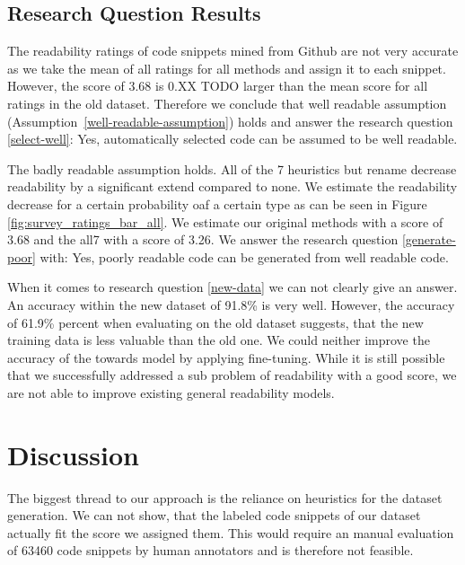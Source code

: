 \documentclass[%
class=scrreprt,
chapterprefix=false,%
open=right,%
twoside=false,%
paper=a4,%
logofile={Logo\_zentral\_farbig\_EN.png},%
thesistype=master,%
UKenglish,%
]{se2thesis}
\theoremstyle{definition}
\begin{document}
\subsection{Research Question Results} \label{Research Question Results}

	The readability ratings of code snippets mined from Github are not very accurate as we take the mean of all ratings for all methods and assign it to each snippet. However, the score of 3.68 is 0.XX TODO larger than the mean score for all ratings in the old dataset. Therefore we conclude that well readable assumption (Assumption~\ref{well-readable-assumption}) holds and answer the research question \ref{select-well}: Yes, automatically selected code can be assumed to be well readable.
	
	The badly readable assumption holds. All of the 7 heuristics but rename decrease readability by a significant extend compared to none. We estimate the readability decrease for a certain probability oaf a certain type as can be seen in Figure \ref{fig:survey_ratings_bar_all}. We estimate our original methods with a score of 3.68 and the all7 with a score of 3.26. We answer the research question \ref{generate-poor} with: Yes, poorly readable code can be generated from well readable code.
	
	When it comes to research question \ref{new-data} we can not clearly give an answer. An accuracy within the new dataset of 91.8\% is very well. However, the accuracy of 61.9\% percent when evaluating on the old dataset suggests, that the new training data is less valuable than the old one. We could neither improve the accuracy of the towards model by applying fine-tuning. While it is still possible that we successfully addressed a sub problem of readability with a good score, we are not able to improve existing general readability models.
	
\section{Discussion} \label{Discussion}

	The biggest thread to our approach is the reliance on heuristics for the dataset generation. We can not show, that the labeled code snippets of our dataset actually fit the score we assigned them. This would require an manual evaluation of 63460 code snippets by human annotators and is therefore not feasible.
	
\end{document}
